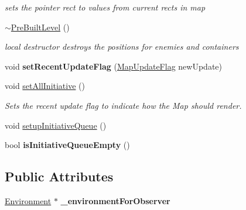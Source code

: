 \begin{DoxyCompactItemize}
\begin{DoxyCompactList}\small\item\em sets the pointer rect to values from current rects in map \end{DoxyCompactList}\item 
\hypertarget{class_pre_built_level_a06411fd72dc81d3792c3e6e6fe0fc416}{}\label{class_pre_built_level_a06411fd72dc81d3792c3e6e6fe0fc416} 
\hyperlink{class_pre_built_level_a06411fd72dc81d3792c3e6e6fe0fc416}{$\sim$\+Pre\+Built\+Level} ()
\begin{DoxyCompactList}\small\item\em local destructor destroys the positions for enemies and containers \end{DoxyCompactList}\item 
\hypertarget{class_pre_built_level_aab970ca56afa175ec359b8fa7814b894}{}\label{class_pre_built_level_aab970ca56afa175ec359b8fa7814b894} 
void {\bfseries set\+Recent\+Update\+Flag} (\hyperlink{namespaces_8h_a8327c0c98430b2c5832c39f0b272c172}{Map\+Update\+Flag} new\+Update)
\item 
void \hyperlink{class_pre_built_level_a4e56751cdcbf9eeb4e093a0b7b9ca53b}{set\+All\+Initiative} ()
\begin{DoxyCompactList}\small\item\em Sets the recent update flag to indicate how the Map should render. \end{DoxyCompactList}\item 
void \hyperlink{class_pre_built_level_a50d13df8b51ee7aee339aa6f2007940e}{setup\+Initiative\+Queue} ()
\item 
\hypertarget{class_pre_built_level_a0344b21db14e95ae8da32384822acf07}{}\label{class_pre_built_level_a0344b21db14e95ae8da32384822acf07} 
bool {\bfseries is\+Initiative\+Queue\+Empty} ()
\end{DoxyCompactItemize}
\subsection*{Public Attributes}
\begin{DoxyCompactItemize}
\item 
\hypertarget{class_pre_built_level_a318774652d942b3ed8f1d22b3a2e992d}{}\label{class_pre_built_level_a318774652d942b3ed8f1d22b3a2e992d} 
\hyperlink{class_environment}{Environment} $\ast$ {\bfseries \+\_\+environment\+For\+Observer}
\end{DoxyCompactItemize}
